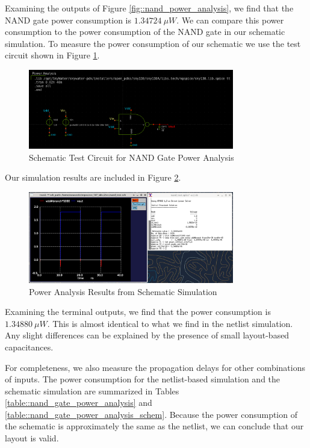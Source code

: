 \documentclass{article}
\begin{document}
	\noindent Examining the outputs of Figure \ref{fig::nand_power_analysis}, we find that the NAND gate power consumption is $1.34724\ \mu{W}$. We can compare this power consumption to the power consumption of the NAND gate in our schematic simulation. To measure the power consumption of our schematic we use the test circuit shown in Figure \ref{fig::nand_power_analysis_test_circuit_schem}.
	
	\begin{figure}[H]
		\centerline{\includegraphics[width=0.8\textwidth]{nand_power_analysis_test_circuit.png}}
		\caption{Schematic Test Circuit for NAND Gate Power Analysis}
		\label{fig::nand_power_analysis_test_circuit_schem}
	\end{figure}
	
	\noindent Our simulation results are included in Figure \ref{fig::nand_power_analysis_schem}.
	
	\begin{figure}[H]
		\centerline{\includegraphics[width=0.8\textwidth]{nand_power_analysis_schem.png}}
		\caption{Power Analysis Results from Schematic Simulation}
		\label{fig::nand_power_analysis_schem}
	\end{figure}
	
	\noindent Examining the terminal outputs, we find that the power consumption is $1.34880\ \mu{W}$. This is almost identical to what we find in the netlist simulation. Any slight differences can be explained by the presence of small layout-based capacitances.
	
	For completeness, we also measure the propagation delays for other combinations of inputs. The power consumption for the netlist-based simulation and the schematic simulation are summarized in Tables \ref{table::nand_gate_power_analysis} and \ref{table::nand_gate_power_analysis_schem}. Because the power consumption of the schematic is approximately the same as the netlist, we can conclude that our layout is valid.
	
\end{document}

